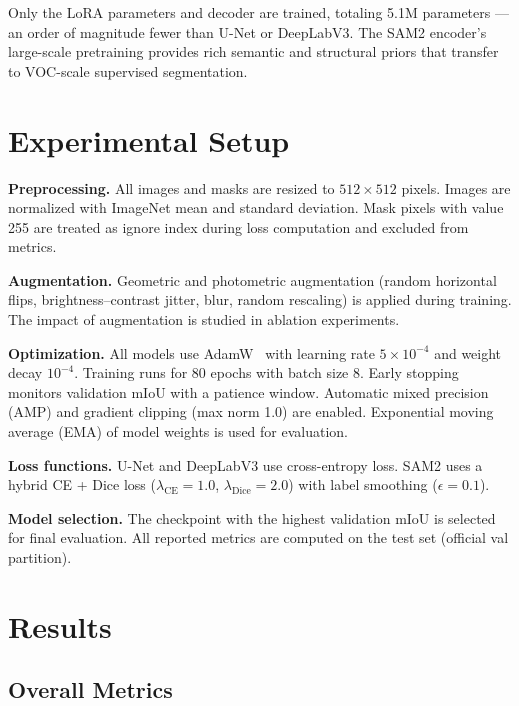 \documentclass[11pt]{article}
\begin{document}
Only the LoRA parameters and decoder are trained, totaling 5.1M parameters --- an order of magnitude fewer than U-Net or DeepLabV3. The SAM2 encoder's large-scale pretraining provides rich semantic and structural priors that transfer to VOC-scale supervised segmentation.

\section{Experimental Setup}

\textbf{Preprocessing.} All images and masks are resized to $512 \times 512$ pixels. Images are normalized with ImageNet mean and standard deviation. Mask pixels with value 255 are treated as ignore index during loss computation and excluded from metrics.

\textbf{Augmentation.} Geometric and photometric augmentation (random horizontal flips, brightness--contrast jitter, blur, random rescaling) is applied during training. The impact of augmentation is studied in ablation experiments.

\textbf{Optimization.} All models use AdamW~\cite{loshchilov2019adamw} with learning rate $5 \times 10^{-4}$ and weight decay $10^{-4}$. Training runs for 80 epochs with batch size 8. Early stopping monitors validation mIoU with a patience window. Automatic mixed precision (AMP) and gradient clipping (max norm 1.0) are enabled. Exponential moving average (EMA) of model weights is used for evaluation.

\textbf{Loss functions.} U-Net and DeepLabV3 use cross-entropy loss. SAM2 uses a hybrid CE + Dice loss ($\lambda_\text{CE} = 1.0$, $\lambda_\text{Dice} = 2.0$) with label smoothing ($\epsilon = 0.1$).

\textbf{Model selection.} The checkpoint with the highest validation mIoU is selected for final evaluation. All reported metrics are computed on the test set (official val partition).

\section{Results}

\subsection{Overall Metrics}
\end{document}
